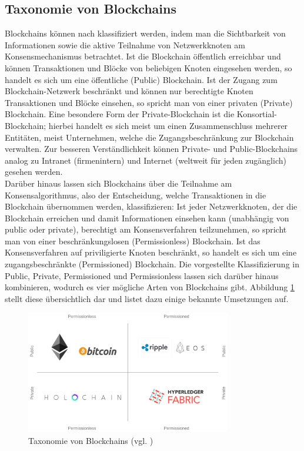\subsection{Taxonomie von Blockchains}
\label{subsec:fundamentals:dlt:taxonomy}
Blockchains können nach \cite{overview2017} klassifiziert werden, indem man die Sichtbarkeit von Informationen sowie die aktive Teilnahme von Netzwerkknoten am Konsensmechanismus betrachtet. Ist die Blockchain öffentlich erreichbar und können Transaktionen und Blöcke von beliebigen Knoten eingesehen werden, so handelt es sich um eine öffentliche (Public) Blockchain. Ist der Zugang zum Blockchain-Netzwerk beschränkt und können nur berechtigte Knoten Transaktionen und Blöcke einsehen, so spricht man von einer privaten (Private) Blockchain. Eine besondere Form der Private-Blockchain ist die Konsortial-Blockchain; hierbei handelt es sich meist um einen Zusammenschluss mehrerer Entitäten, meist Unternehmen, welche die Zugangsbeschränkung zur Blockchain verwalten. Zur besseren Verständlichkeit können Private- und Public-Blockchains analog zu Intranet (firmenintern) und Internet (weltweit für jeden zugänglich) gesehen werden.\\
Darüber hinaus lassen sich Blockchains über die Teilnahme am Konsensalgorithmus, also der Entscheidung, welche Transaktionen in die Blockchain übernommen werden, klassifizieren: Ist jeder Netzwerkknoten, der die Blockchain erreichen und damit Informationen einsehen kann (unabhängig von public oder private), berechtigt am Konsensverfahren teilzunehmen, so spricht man von einer beschränkungslosen (Permissionless) Blockchain. Ist das Konsensverfahren auf priviligierte Knoten beschränkt, so handelt es sich um eine zugangsbeschränkte (Permissioned) Blockchain. Die vorgestellte Klassifizierung in Public, Private, Permissioned und Permissionless lassen sich darüber hinaus kombinieren, wodurch es vier mögliche Arten von Blockchains gibt. Abbildung \ref{fig:chapter02:taxonomy} stellt diese übersichtlich dar und listet dazu einige bekannte Umsetzungen auf.

\begin{figure}[htbp]
 \centering
 \includegraphics[width=0.8\textwidth]{gfx/taxonomy.png}
 \caption{Taxonomie von Blockchains (vgl. \cite{daniels2018})}
 \label{fig:chapter02:taxonomy}
\end{figure}


